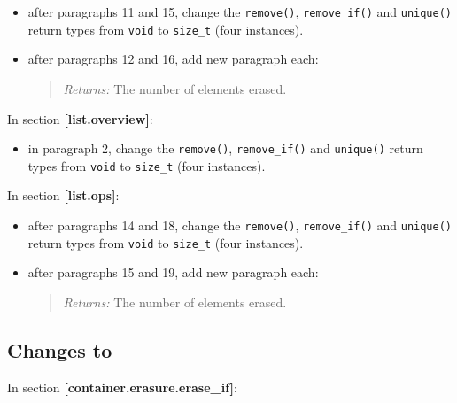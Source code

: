 \documentclass[11pt]{article}
\begin{document}
\begin{itemize}
\item after paragraphs 11 and 15, change the \texttt{remove()},
  \texttt{remove\_if()} and \texttt{unique()} return types from
  \texttt{void} to \texttt{size\_t} (four instances).
\item after paragraphs 12 and 16, add new paragraph each:
  \begin{quotation}
    \textit{Returns:} The number of elements erased.
  \end{quotation}
\end{itemize}

In section \textbf{[list.overview]}:

\begin{itemize}
\item in paragraph 2, change the \texttt{remove()},
  \texttt{remove\_if()} and \texttt{unique()} return types from
  \texttt{void} to \texttt{size\_t} (four instances).
\end{itemize}

In section \textbf{[list.ops]}:

\begin{itemize}
\item after paragraphs 14 and 18, change the \texttt{remove()},
  \texttt{remove\_if()} and \texttt{unique()} return types from
  \texttt{void} to \texttt{size\_t} (four instances).
\item after paragraphs 15 and 19, add new paragraph each:
  \begin{quotation}
    \textit{Returns:} The number of elements erased.
  \end{quotation}
\end{itemize}

\subsection{Changes to \cite{LFv2TS}}

In section \textbf{[container.erasure.erase\_if]}:
\end{document}
